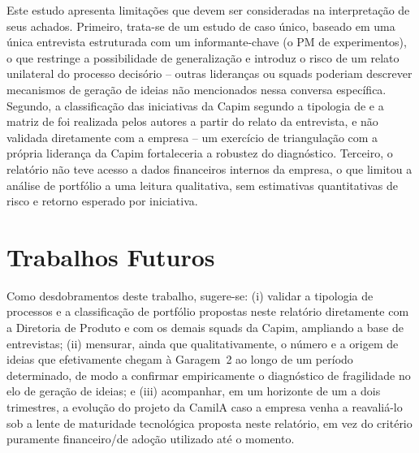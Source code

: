 Este estudo apresenta limitações que devem ser consideradas na interpretação de seus achados. Primeiro, trata-se de um estudo de caso único, baseado em uma única entrevista estruturada com um informante-chave (o PM de experimentos), o que restringe a possibilidade de generalização e introduz o risco de um relato unilateral do processo decisório -- outras lideranças ou squads poderiam descrever mecanismos de geração de ideias não mencionados nessa conversa específica. Segundo, a classificação das iniciativas da Capim segundo a tipologia de \textcite{salerno2015} e a matriz de \textcite{goffinmitchell2010} foi realizada pelos autores a partir do relato da entrevista, e não validada diretamente com a empresa -- um exercício de triangulação com a própria liderança da Capim fortaleceria a robustez do diagnóstico. Terceiro, o relatório não teve acesso a dados financeiros internos da empresa, o que limitou a análise de portfólio a uma leitura qualitativa, sem estimativas quantitativas de risco e retorno esperado por iniciativa.

\section{Trabalhos Futuros}

Como desdobramentos deste trabalho, sugere-se: (i) validar a tipologia de processos e a classificação de portfólio propostas neste relatório diretamente com a Diretoria de Produto e com os demais squads da Capim, ampliando a base de entrevistas; (ii) mensurar, ainda que qualitativamente, o número e a origem de ideias que efetivamente chegam à Garagem~2 ao longo de um período determinado, de modo a confirmar empiricamente o diagnóstico de fragilidade no elo de geração de ideias; e (iii) acompanhar, em um horizonte de um a dois trimestres, a evolução do projeto da CamilA caso a empresa venha a reavaliá-lo sob a lente de maturidade tecnológica proposta neste relatório, em vez do critério puramente financeiro/de adoção utilizado até o momento.
